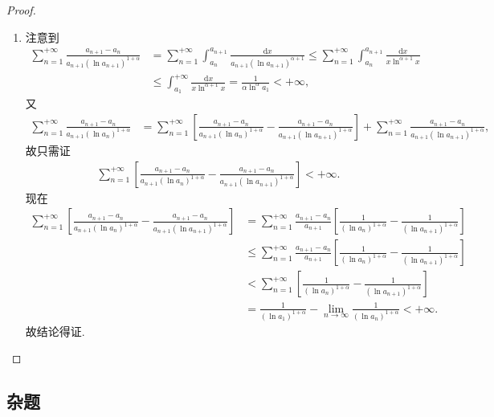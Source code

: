 \documentclass[../../main.tex]{subfiles}%
\begin{document}
\begin{proof}
\begin{enumerate}[(1)]
\item 注意到
\begin{align*}
\sum_{n=1}^{+\infty} \frac{a_{n+1} - a_n}{a_{n+1}(\ln a_{n+1})^{1+\alpha}} &= \sum_{n=1}^{+\infty} \int_{a_n}^{a_{n+1}} \frac{\mathrm{d}x}{a_{n+1}(\ln a_{n+1})^{\alpha + 1}} \leqslant \sum_{n=1}^{+\infty} \int_{a_n}^{a_{n+1}} \frac{\mathrm{d}x}{x\ln^{\alpha + 1}x} \\
&\leqslant \int_{a_1}^{+\infty} \frac{\mathrm{d}x}{x\ln^{\alpha + 1}x} = \frac{1}{\alpha \ln^{\alpha}a_1} < +\infty,
\end{align*}
又
\begin{align*}
\sum_{n=1}^{+\infty} \frac{a_{n+1} - a_n}{a_{n+1}(\ln a_n)^{1+\alpha}} &= \sum_{n=1}^{+\infty} \left[ \frac{a_{n+1} - a_n}{a_{n+1}(\ln a_n)^{1+\alpha}} - \frac{a_{n+1} - a_n}{a_{n+1}(\ln a_{n+1})^{1+\alpha}} \right] + \sum_{n=1}^{+\infty} \frac{a_{n+1} - a_n}{a_{n+1}(\ln a_{n+1})^{1+\alpha}},
\end{align*}
故只需证
\begin{align*}
\sum_{n=1}^{+\infty} \left[ \frac{a_{n+1} - a_n}{a_{n+1}(\ln a_n)^{1+\alpha}} - \frac{a_{n+1} - a_n}{a_{n+1}(\ln a_{n+1})^{1+\alpha}} \right] < +\infty.
\end{align*}
现在
\begin{align*}
\sum_{n=1}^{+\infty} \left[ \frac{a_{n+1} - a_n}{a_{n+1}(\ln a_n)^{1+\alpha}} - \frac{a_{n+1} - a_n}{a_{n+1}(\ln a_{n+1})^{1+\alpha}} \right] &= \sum_{n=1}^{+\infty} \frac{a_{n+1} - a_n}{a_{n+1}} \left[ \frac{1}{(\ln a_n)^{1+\alpha}} - \frac{1}{(\ln a_{n+1})^{1+\alpha}} \right] \\
&\leqslant \sum_{n=1}^{+\infty} \frac{a_{n+1} - a_n}{a_{n+1}} \left[ \frac{1}{(\ln a_n)^{1+\alpha}} - \frac{1}{(\ln a_{n+1})^{1+\alpha}} \right] \\
&< \sum_{n=1}^{+\infty} \left[ \frac{1}{(\ln a_n)^{1+\alpha}} - \frac{1}{(\ln a_{n+1})^{1+\alpha}} \right] \\
&= \frac{1}{(\ln a_1)^{1+\alpha}} - \lim_{n \rightarrow \infty} \frac{1}{(\ln a_n)^{1+\alpha}} < +\infty.
\end{align*}
故结论得证.
\end{enumerate}
\end{proof}



\subsection{杂题}
\end{document}
